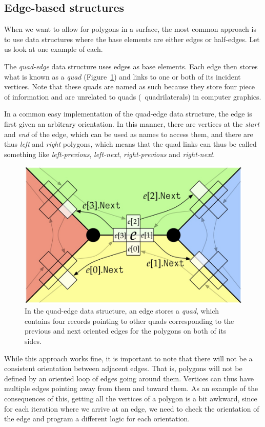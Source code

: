 \subsection{Edge-based structures}

When we want to allow for polygons in a surface, the most common approach is to use data structures where the base elements are either edges or half-edges.
Let us look at one example of each.

The \emph{quad-edge} data structure uses edges as base elements.
Each edge then stores what is known as a \emph{quad} (Figure~\ref{fig:quad}) and links to one or both of its incident vertices.
Note that these quads are named as such because they store four piece of information and are unrelated to quads (\ie\ quadrilaterals) in computer graphics.

In a common easy implementation of the quad-edge data structure, the edge is first given an arbitrary orientation.
In this manner, there are vertices at the \emph{start} and \emph{end} of the edge, which can be used as names to access them, and there are thus \emph{left} and \emph{right} polygons, which means that the quad links can thus be called something like \emph{left-previous}, \emph{left-next}, \emph{right-previous} and \emph{right-next}.

\begin{figure}[b]
\centering
\includegraphics[width=0.7\linewidth]{figs/quad}
\caption{In the quad-edge data structure, an edge stores a \emph{quad}, which contains four records pointing to other quads corresponding to the previous and next oriented edges for the polygons on both of its sides.}%
\label{fig:quad}
\end{figure}

While this approach works fine, it is important to note that there will not be a consistent orientation between adjacent edges.
That is, polygons will not be defined by an oriented loop of edges going around them.
Vertices can thus have multiple edges pointing away from them and toward them.
As an example of the consequences of this, getting all the vertices of a polygon is a bit awkward, since for each iteration where we arrive at an edge, we need to check the orientation of the edge and program a different logic for each orientation.

